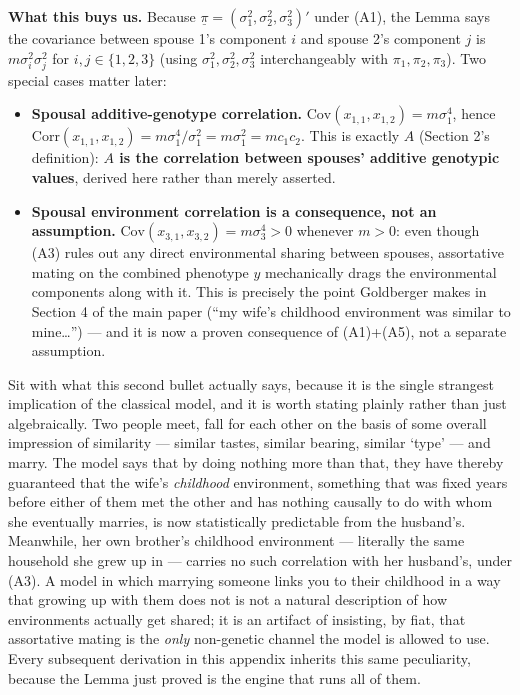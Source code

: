 \documentclass[12pt]{article}
\begin{document}
\textbf{What this buys us.} Because $\underline\pi=(\sigma_1^2,\sigma_2^2,\sigma_3^2)'$ under (A1), the Lemma says the covariance between spouse 1's component $i$ and spouse 2's component $j$ is $m\sigma_i^2\sigma_j^2$ for $i,j\in\{1,2,3\}$ (using $\sigma_1^2,\sigma_2^2,\sigma_3^2$ interchangeably with $\pi_1,\pi_2,\pi_3$). Two special cases matter later:
\begin{itemize}
\item \textbf{Spousal additive-genotype correlation.} $\mathrm{Cov}(x_{1,1},x_{1,2}) = m\sigma_1^4$, hence $\mathrm{Corr}(x_{1,1},x_{1,2}) = m\sigma_1^4/\sigma_1^2 = m\sigma_1^2 = mc_1c_2$. This is exactly $A$ (Section 2's definition): \textbf{$A$ is the correlation between spouses' additive genotypic values}, derived here rather than merely asserted.
\item \textbf{Spousal environment correlation is a consequence, not an assumption.} $\mathrm{Cov}(x_{3,1},x_{3,2})=m\sigma_3^4>0$ whenever $m>0$: even though (A3) rules out any direct environmental sharing between spouses, assortative mating on the combined phenotype $y$ mechanically drags the environmental components along with it. This is precisely the point Goldberger makes in Section 4 of the main paper (``my wife's childhood environment was similar to mine\ldots'') — and it is now a proven consequence of (A1)+(A5), not a separate assumption.
\end{itemize}

Sit with what this second bullet actually says, because it is the single strangest implication of the classical model, and it is worth stating plainly rather than just algebraically. Two people meet, fall for each other on the basis of some overall impression of similarity — similar tastes, similar bearing, similar `type' — and marry. The model says that by doing nothing more than that, they have thereby guaranteed that the wife's \emph{childhood} environment, something that was fixed years before either of them met the other and has nothing causally to do with whom she eventually marries, is now statistically predictable from the husband's. Meanwhile, her own brother's childhood environment — literally the same household she grew up in — carries no such correlation with her husband's, under (A3). A model in which marrying someone links you to their childhood in a way that growing up with them does not is not a natural description of how environments actually get shared; it is an artifact of insisting, by fiat, that assortative mating is the \emph{only} non-genetic channel the model is allowed to use. Every subsequent derivation in this appendix inherits this same peculiarity, because the Lemma just proved is the engine that runs all of them.
\end{document}
